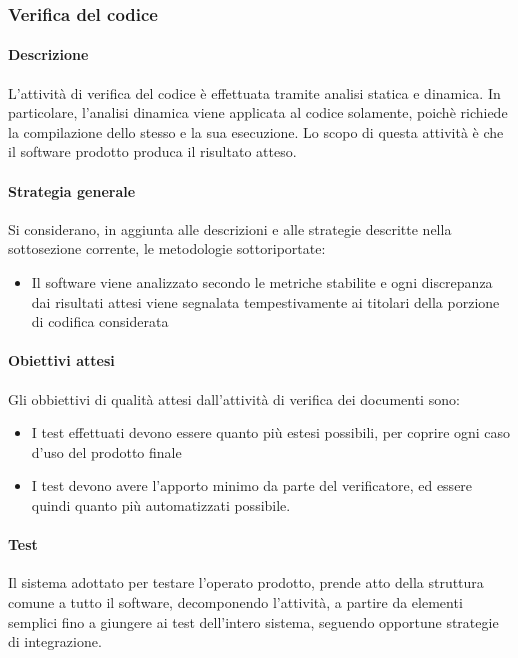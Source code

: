 		\subsubsection{Verifica del codice}
		
		\paragraph{Descrizione}
		L’attività di verifica del codice è effettuata tramite analisi statica e dinamica. In particolare, l'analisi dinamica viene applicata al codice solamente, poichè richiede la compilazione dello stesso e la sua esecuzione. Lo scopo di questa attività è che il software prodotto produca il risultato atteso.
		
		\paragraph{Strategia generale}
		Si considerano, in aggiunta alle descrizioni e alle strategie descritte nella sottosezione corrente, le metodologie sottoriportate:
		
		\begin{itemize}
			\item Il software viene analizzato secondo le metriche stabilite e ogni discrepanza dai risultati attesi viene segnalata tempestivamente ai titolari della porzione di codifica considerata 
		\end{itemize}
		
		\paragraph{Obiettivi attesi}
		Gli obbiettivi di qualità attesi dall'attività di verifica dei documenti sono:
		
		\begin{itemize}
			\item I test effettuati devono essere quanto più estesi possibili, per coprire ogni caso d'uso del prodotto finale
			\item I test devono avere l'apporto minimo da parte del verificatore, ed essere quindi quanto più automatizzati possibile.
		\end{itemize}
		
		\paragraph{Test}
		Il sistema adottato per testare l'operato prodotto, prende atto della struttura comune a tutto il software, decomponendo l'attività, a partire da elementi semplici fino a giungere ai test dell'intero sistema, seguendo opportune strategie di integrazione.
		

